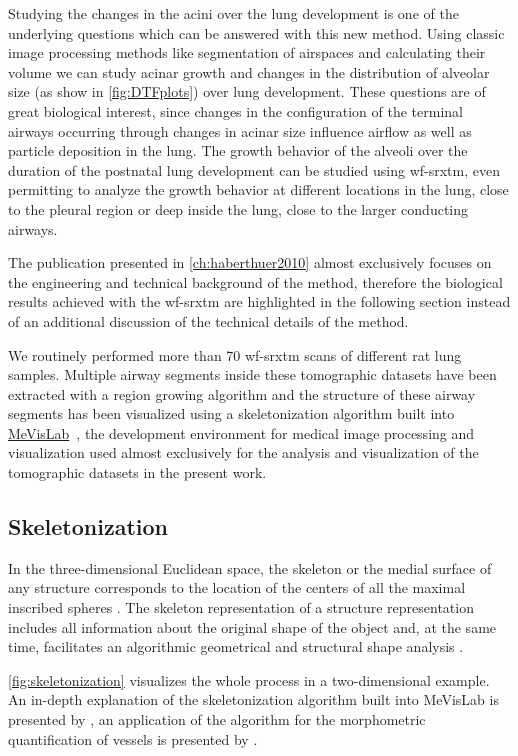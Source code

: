 Studying the changes in the acini over the lung development is one of the underlying questions which can be answered with this new method. Using classic image processing methods like segmentation of airspaces and calculating their volume we can study acinar growth and changes in the distribution of alveolar size (as show in \autoref{fig:DTFplots}) over lung development. These questions are of great biological interest, since changes in the configuration of the terminal airways occurring through changes in acinar size influence airflow as well as particle deposition in the lung. The growth behavior of the alveoli over the duration of the postnatal lung development can be studied using \ac{wf-srxtm}, even permitting to analyze the growth behavior at different locations in the lung, \eg close to the pleural region or deep inside the lung, close to the larger conducting airways.

The publication presented in \autoref{ch:haberthuer2010} almost exclusively focuses on the engineering and technical background of the method, therefore the biological results achieved with the \ac{wf-srxtm} are highlighted in the following section instead of an additional discussion of the technical details of the method.

We routinely performed more than 70 \ac{wf-srxtm} scans of different rat lung samples. Multiple airway segments inside these tomographic datasets have been extracted with a region growing algorithm \cite{wiki:regiongrowing,Zucker1976} and the structure of these airway segments has been visualized using a skeletonization algorithm built into \href{http://mevislab.de/}{MeVisLab}~\cite{Bitter2007}, the development environment for medical image processing and visualization used almost exclusively for the analysis and visualization of the tomographic datasets in the present work.

\subsection{Skeletonization}
In the three-dimensional Euclidean space, the skeleton or the medial surface of any structure corresponds to the location of the centers of all the maximal inscribed spheres \cite{Blum1967}. The skeleton representation of a structure representation includes all information about the original shape of the object and, at the same time, facilitates an algorithmic geometrical and structural shape analysis \cite{Selle2002}. 

\autoref{fig:skeletonization} visualizes the whole process in a two-dimensional example. An in-depth explanation of the skeletonization algorithm built into MeVisLab is presented by \citet{Selle2002}, an application of the algorithm for the morphometric quantification of vessels is presented by \citet{Boskamp2004}.


